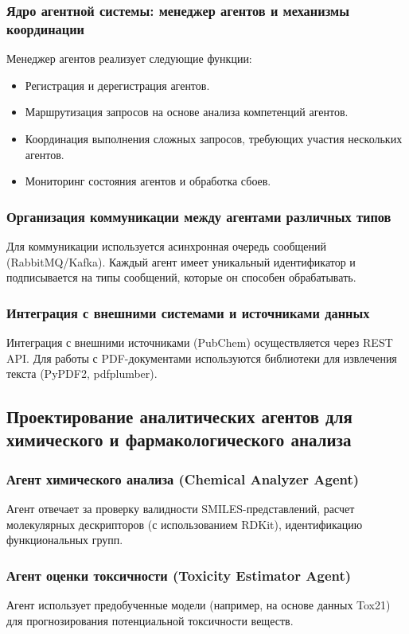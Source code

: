 \documentclass[a4paper,14pt]{extarticle}
\begin{document}
	\subsubsection{Ядро агентной системы: менеджер агентов и механизмы координации}
	Менеджер агентов реализует следующие функции:
	\begin{itemize}
		\item Регистрация и дерегистрация агентов.
		\item Маршрутизация запросов на основе анализа компетенций агентов.
		\item Координация выполнения сложных запросов, требующих участия нескольких агентов.
		\item Мониторинг состояния агентов и обработка сбоев.
	\end{itemize}
	
	\subsubsection{Организация коммуникации между агентами различных типов}
	Для коммуникации используется асинхронная очередь сообщений (RabbitMQ/Kafka). Каждый агент имеет уникальный идентификатор и подписывается на типы сообщений, которые он способен обрабатывать.
	
	\subsubsection{Интеграция с внешними системами и источниками данных}
	Интеграция с внешними источниками (PubChem) осуществляется через REST API. Для работы с PDF-документами используются библиотеки для извлечения текста (PyPDF2, pdfplumber).
	
	\subsection{Проектирование аналитических агентов для химического и фармакологического анализа}
	
	\subsubsection{Агент химического анализа (Chemical Analyzer Agent)}
	Агент отвечает за проверку валидности SMILES-представлений, расчет молекулярных дескрипторов (с использованием RDKit), идентификацию функциональных групп.
	
	\subsubsection{Агент оценки токсичности (Toxicity Estimator Agent)}
	Агент использует предобученные модели (например, на основе данных Tox21) для прогнозирования потенциальной токсичности веществ.
	
\end{document}
